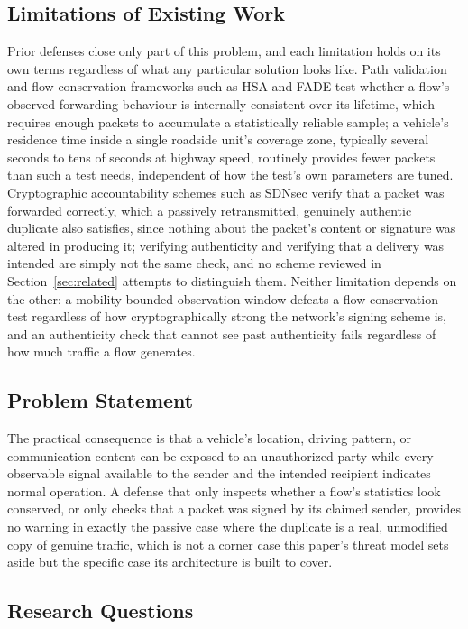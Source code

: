 \documentclass[final,5p,twocolumn]{elsarticle}
\theoremstyle{remark}
\theoremstyle{plain}
\begin{document}
\subsection{Limitations of Existing Work}

Prior defenses close only part of this problem, and each limitation holds
on its own terms regardless of what any particular solution looks like.
Path validation and flow conservation frameworks such as HSA and FADE
test whether a flow's observed forwarding behaviour is internally
consistent over its lifetime, which requires enough packets to
accumulate a statistically reliable sample; a vehicle's residence time
inside a single roadside unit's coverage zone, typically several seconds
to tens of seconds at highway speed, routinely provides fewer packets
than such a test needs, independent of how the test's own parameters are
tuned. Cryptographic accountability schemes such as SDNsec verify that a
packet was forwarded correctly, which a passively retransmitted,
genuinely authentic duplicate also satisfies, since nothing about the
packet's content or signature was altered in producing it; verifying
authenticity and verifying that a delivery was intended are simply not
the same check, and no scheme reviewed in Section~\ref{sec:related}
attempts to distinguish them. Neither limitation depends on the other:
a mobility bounded observation window defeats a flow conservation test
regardless of how cryptographically strong the network's signing scheme
is, and an authenticity check that cannot see past authenticity fails
regardless of how much traffic a flow generates.

\subsection{Problem Statement}

The practical consequence is that a vehicle's location, driving pattern,
or communication content can be exposed to an unauthorized party while
every observable signal available to the sender and the intended
recipient indicates normal operation. A defense that only inspects
whether a flow's statistics look conserved, or only checks that a packet
was signed by its claimed sender, provides no warning in exactly the
passive case where the duplicate is a real, unmodified copy of genuine
traffic, which is not a corner case this paper's threat model sets aside
but the specific case its architecture is built to cover.

\subsection{Research Questions}
\end{document}
